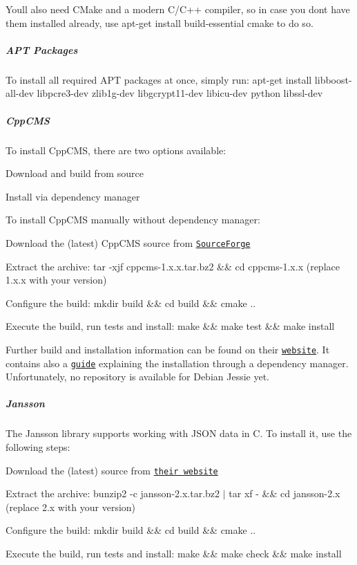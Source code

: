 You\textquotesingle{}ll also need C\+Make and a modern C/\+C++ compiler, so in case you don\textquotesingle{}t have them installed already, use {\ttfamily apt-\/get install build-\/essential cmake} to do so.

\subparagraph*{A\+PT Packages}

To install all required A\+PT packages at once, simply run\+: {\ttfamily apt-\/get install libboost-\/all-\/dev libpcre3-\/dev zlib1g-\/dev libgcrypt11-\/dev libicu-\/dev python libssl-\/dev}

\subparagraph*{Cpp\+C\+MS}

To install Cpp\+C\+MS, there are two options available\+:


\begin{DoxyItemize}
\item Download and build from source
\item Install via dependency manager
\end{DoxyItemize}

To install Cpp\+C\+MS manually without dependency manager\+:


\begin{DoxyItemize}
\item Download the (latest) Cpp\+C\+MS source from \href{https://sourceforge.net/projects/cppcms/files/cppcms/}{\tt Source\+Forge}
\item Extract the archive\+: {\ttfamily tar -\/xjf cppcms-\/1.\+x.\+x.\+tar.\+bz2 \&\& cd cppcms-\/1.\+x.\+x} (replace 1.\+x.\+x with your version)
\item Configure the build\+: {\ttfamily mkdir build \&\& cd build \&\& cmake ..}
\item Execute the build, run tests and install\+: {\ttfamily make \&\& make test \&\& make install}
\end{DoxyItemize}

Further build and installation information can be found on their \href{http://cppcms.com/wikipp/en/page/cppcms_1x_build}{\tt website}. It contains also a \href{http://cppcms.com/wikipp/en/page/apt}{\tt guide} explaining the installation through a dependency manager. Unfortunately, no repository is available for Debian Jessie yet.

\subparagraph*{Jansson}

The Jansson library supports working with J\+S\+ON data in C. To install it, use the following steps\+:


\begin{DoxyItemize}
\item Download the (latest) source from \href{http://www.digip.org/jansson/releases/}{\tt their website}
\item Extract the archive\+: {\ttfamily bunzip2 -\/c jansson-\/2.\+x.\+tar.\+bz2 $\vert$ tar xf -\/ \&\& cd jansson-\/2.\+x} (replace 2.\+x with your version)
\item Configure the build\+: {\ttfamily mkdir build \&\& cd build \&\& cmake ..}
\item Execute the build, run tests and install\+: {\ttfamily make \&\& make check \&\& make install}
\end{DoxyItemize}

